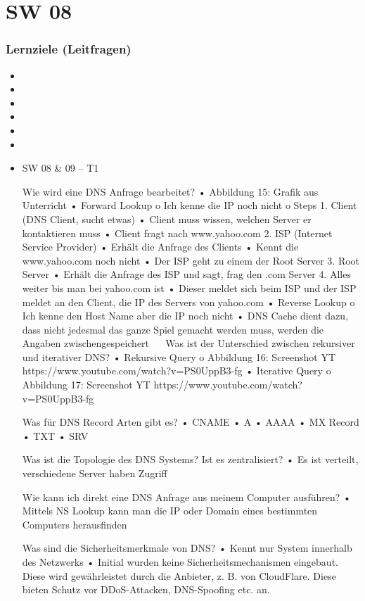 \part{SW 08}
\section{Lernziele (Leitfragen)}
\begin{itemize}
    \item
    \item
    \item
    \item
    \item
    \item
    \item
    
    SW 08 & 09 – T1

Wie wird eine DNS Anfrage bearbeitet?
•	 
Abbildung 15: Grafik aus Unterricht
•	Forward Lookup
o	Ich kenne die IP noch nicht
o	Steps
1.	Client (DNS Client, sucht etwas) 
•	Client muss wissen, welchen Server er kontaktieren muss
•	Client fragt nach www.yahoo.com
2.	ISP (Internet Service Provider) 
•	Erhält die Anfrage des Clients
•	Kennt die www.yahoo.com noch nicht
•	Der ISP geht zu einem der Root Server
3.	Root Server
•	Erhält die Anfrage des ISP und sagt, frag den .com Server
4.	Alles weiter bis man bei yahoo.com ist
•	Dieser meldet sich beim ISP und der ISP meldet an den Client, die IP des Servers von yahoo.com
•	Reverse Lookup 
o	Ich kenne den Host Name aber die IP noch nicht
•	DNS Cache dient dazu, dass nicht jedesmal das ganze Spiel gemacht werden muss, werden die Angaben zwischengespeichert
 
Was ist der Unterschied zwischen rekursiver und iterativer DNS?
•	Rekursive Query
o	 
Abbildung 16: Screenshot YT https://www.youtube.com/watch?v=PS0UppB3-fg
•	Iterative Query
o	 
Abbildung 17: Screenshot YT https://www.youtube.com/watch?v=PS0UppB3-fg

Was für DNS Record Arten gibt es?
•	CNAME
•	A
•	AAAA
•	MX Record
•	TXT
•	SRV

Was ist die Topologie des DNS Systems? Ist es zentralisiert?
•	Es ist verteilt, verschiedene Server haben Zugriff
 

Wie kann ich direkt eine DNS Anfrage aus meinem Computer ausführen?
•	Mittels NS Lookup kann man die IP oder Domain eines bestimmten Computers herausfinden

Was sind die Sicherheitsmerkmale von DNS?
•	Kennt nur System innerhalb des Netzwerks
•	Initial wurden keine Sicherheitsmechanismen eingebaut. Diese wird gewährleistet durch die Anbieter, z. B. von CloudFlare. Diese bieten Schutz vor DDoS-Attacken, DNS-Spoofing etc. an. 


\end{itemize}
